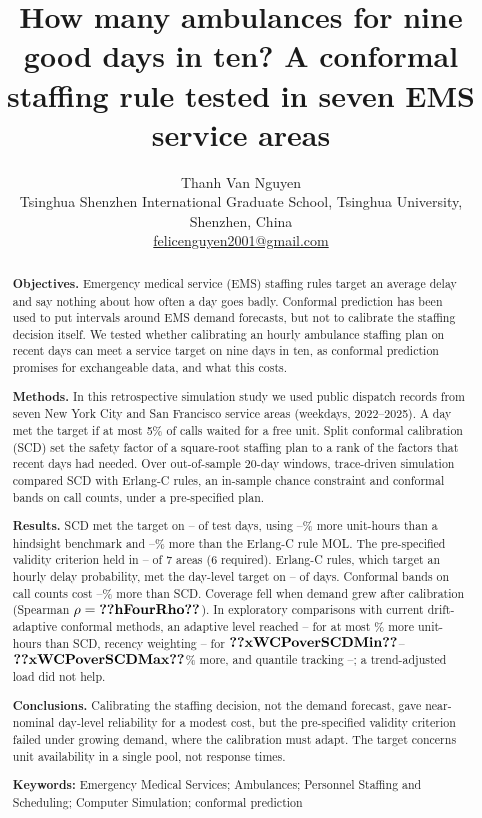 \documentclass[11pt]{article}
\title{How many ambulances for nine good days in ten? A conformal staffing rule tested in seven EMS service areas}
\author{}
\date{}
\author{Thanh Van Nguyen\\[2pt]
\small Tsinghua Shenzhen International Graduate School, Tsinghua University, Shenzhen, China\\
\small \href{mailto:felicenguyen2001@gmail.com}{felicenguyen2001@gmail.com}}
\date{}
\begin{document}
\maketitle
\linenumbers

\begin{abstract}
\noindent\textbf{Objectives.} Emergency medical service (EMS) staffing rules target an average delay and say nothing about how often a day goes badly. Conformal prediction has been used to put intervals around EMS demand forecasts, but not to calibrate the staffing decision itself. We tested whether calibrating an hourly ambulance staffing plan on recent days can meet a service target on nine days in ten, as conformal prediction promises for exchangeable data, and what this costs.

\noindent\textbf{Methods.} In this retrospective simulation study we used  public dispatch records from seven New York City and San Francisco service areas (weekdays, 2022--2025). A day met the target if at most 5\% of calls waited for a free unit. Split conformal calibration (SCD) set the safety factor of a square-root staffing plan to a rank of the factors that recent days had needed. Over  out-of-sample 20-day windows, trace-driven simulation compared SCD with Erlang-C rules, an in-sample chance constraint and conformal bands on call counts, under a pre-specified plan.

\noindent\textbf{Results.} SCD met the target on -- of test days, using --\% more unit-hours than a hindsight benchmark and --\% more than the Erlang-C rule MOL. The pre-specified validity criterion held in -- of 7 areas (6 required). Erlang-C rules, which target an hourly delay probability, met the day-level target on -- of days. Conformal bands on call counts cost --\% more than SCD. Coverage fell when demand grew after calibration (Spearman $\rho=\res{hFourRho}$). In exploratory comparisons with current drift-adaptive conformal methods, an adaptive level reached -- for at most \% more unit-hours than SCD, recency weighting -- for $\res{xWCPoverSCDMin}$--$\res{xWCPoverSCDMax}$\% more, and quantile tracking --; a trend-adjusted load did not help.

\noindent\textbf{Conclusions.} Calibrating the staffing decision, not the demand forecast, gave near-nominal day-level reliability for a modest cost, but the pre-specified validity criterion failed under growing demand, where the calibration must adapt. The target concerns unit availability in a single pool, not response times.

\medskip\noindent\textbf{Keywords:} Emergency Medical Services; Ambulances; Personnel Staffing and Scheduling; Computer Simulation; conformal prediction
\end{abstract}
\end{document}
